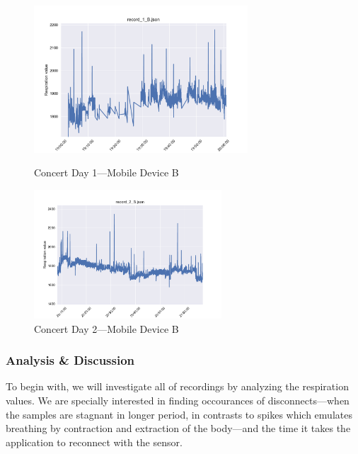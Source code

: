 \begin{figure}
\parbox{7cm}{
\includegraphics[width=8cm]{images/Record_1_B.pdf}
\caption{Concert Day 1---Mobile Device B}
\label{fig:day_1}}
\qquad
\begin{minipage}{6cm}
\includegraphics[width=7cm]{images/Record_2_B.pdf}
\caption{Concert Day 2---Mobile Device B}
\label{fig:day_2}
\end{minipage}
\end{figure}

\subsubsection{Analysis \& Discussion}
To begin with, we will investigate all of recordings by analyzing the respiration values. We are specially interested in finding occourances of disconnects---when the samples are stagnant in longer period, in contrasts to spikes which emulates breathing by contraction and extraction of the body---and the time it takes the application to reconnect with the sensor.


\begin{table}
\begin{center}
\caption{Day 1---Duration: 1 hour \& Roof Samples: 5145}
\end{center}
\end{table}


